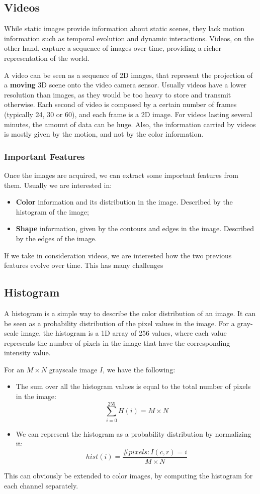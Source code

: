 \subsection{Videos}
While static images provide information about static scenes, they lack motion information
such as temporal evolution and dynamic interactions.
Videos, on the other hand, capture a sequence of images over time, providing a richer representation of the world.

A video can be seen as a sequence of 2D images, that represent the projection of a \textbf{moving} 3D scene onto the video camera sensor.
Usually videos have a lower resolution than images, as they would be too heavy to store and transmit otherwise. Each second of video is composed by a certain number of frames
(typically 24, 30 or 60), and each frame is a 2D image. For videos lasting several minutes, the amount of data can be huge.
Also, the information carried by videos is mostly given by the motion, and not by the color information.

\subsubsection{Important Features}
Once the images are acquired, we can extract some important features from them. Usually we are interested in:
\begin{itemize}
    \item \textbf{Color} information and its distribution in the image. Described by the histogram of the image;
    \item \textbf{Shape} information, given by the contours and edges in the image. Described by the edges of the image.
\end{itemize}
If we take in consideration videos, we are interested how the two previous features evolve over time.
This has many challenges

\subsection{Histogram}
A histogram is a simple way to describe the color distribution of an image. 
It can be seen as a probability distribution of the pixel values in the image.
For a gray-scale image, the histogram is a 1D array of 256 values, where each value 
represents the number of pixels in the image that have the corresponding intensity value.

For an $M \times N$ grayscale image $I$, we have the following:
\begin{itemize}
    \item The sum over all the histogram values is equal to the total number of pixels in the image:
    \[ \sum_{i=0}^{255} H(i) = M \times N \]
    \item We can represent the histogram as a probability distribution by normalizing it:
    \[ hist(i) = \frac{\#pixels: I(c,r) = i}{M \times N} \]
\end{itemize}
This can obviously be extended to color images, by computing the histogram for each channel separately.

